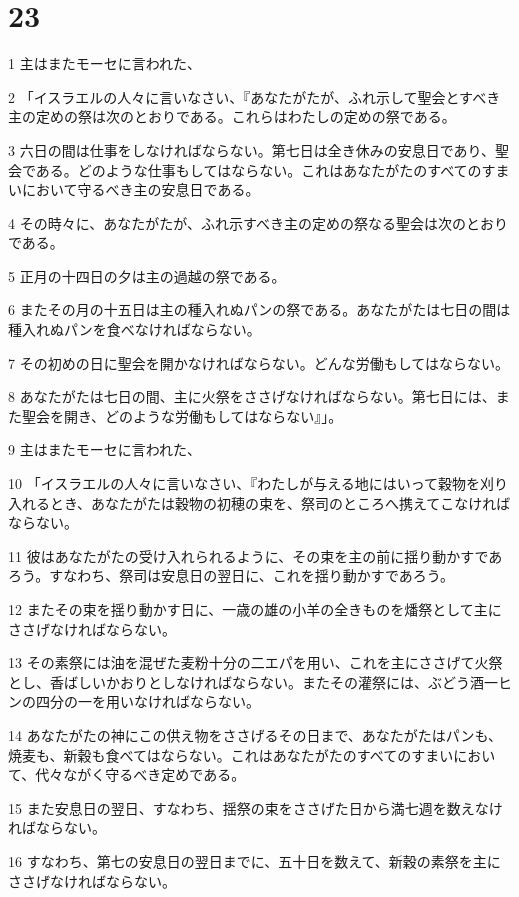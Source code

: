 \chapter{23}

\par 1 主はまたモーセに言われた、
\par 2 「イスラエルの人々に言いなさい、『あなたがたが、ふれ示して聖会とすべき主の定めの祭は次のとおりである。これらはわたしの定めの祭である。
\par 3 六日の間は仕事をしなければならない。第七日は全き休みの安息日であり、聖会である。どのような仕事もしてはならない。これはあなたがたのすべてのすまいにおいて守るべき主の安息日である。
\par 4 その時々に、あなたがたが、ふれ示すべき主の定めの祭なる聖会は次のとおりである。
\par 5 正月の十四日の夕は主の過越の祭である。
\par 6 またその月の十五日は主の種入れぬパンの祭である。あなたがたは七日の間は種入れぬパンを食べなければならない。
\par 7 その初めの日に聖会を開かなければならない。どんな労働もしてはならない。
\par 8 あなたがたは七日の間、主に火祭をささげなければならない。第七日には、また聖会を開き、どのような労働もしてはならない』」。
\par 9 主はまたモーセに言われた、
\par 10 「イスラエルの人々に言いなさい、『わたしが与える地にはいって穀物を刈り入れるとき、あなたがたは穀物の初穂の束を、祭司のところへ携えてこなければならない。
\par 11 彼はあなたがたの受け入れられるように、その束を主の前に揺り動かすであろう。すなわち、祭司は安息日の翌日に、これを揺り動かすであろう。
\par 12 またその束を揺り動かす日に、一歳の雄の小羊の全きものを燔祭として主にささげなければならない。
\par 13 その素祭には油を混ぜた麦粉十分の二エパを用い、これを主にささげて火祭とし、香ばしいかおりとしなければならない。またその灌祭には、ぶどう酒一ヒンの四分の一を用いなければならない。
\par 14 あなたがたの神にこの供え物をささげるその日まで、あなたがたはパンも、焼麦も、新穀も食べてはならない。これはあなたがたのすべてのすまいにおいて、代々ながく守るべき定めである。
\par 15 また安息日の翌日、すなわち、揺祭の束をささげた日から満七週を数えなければならない。
\par 16 すなわち、第七の安息日の翌日までに、五十日を数えて、新穀の素祭を主にささげなければならない。
